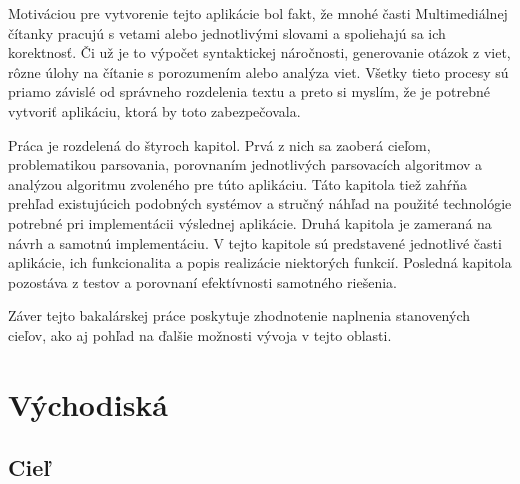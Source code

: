 \documentclass[12pt,a4paper]{report}
\theoremstyle{definition}
\theoremstyle{remark}
\begin{document}
Motiváciou pre vytvorenie tejto aplikácie bol fakt, že mnohé časti Multimediálnej čítanky pracujú s vetami alebo jednotlivými slovami a spoliehajú sa ich korektnosť. Či už je to výpočet syntaktickej náročnosti, generovanie otázok z viet,  rôzne úlohy na čítanie s porozumením alebo analýza viet. Všetky tieto procesy sú priamo závislé od správneho rozdelenia textu a preto si myslím, že je potrebné vytvoriť aplikáciu, ktorá by toto zabezpečovala.

\bigskip


Práca je rozdelená do štyroch kapitol. Prvá z nich sa zaoberá cieľom, problematikou parsovania, porovnaním jednotlivých parsovacích algoritmov a analýzou algoritmu zvoleného pre túto aplikáciu. Táto kapitola tiež zahŕňa prehľad existujúcich podobných systémov a stručný náhľad na použité technológie potrebné pri implementácii výslednej aplikácie. Druhá kapitola je zameraná na návrh a samotnú implementáciu. V tejto kapitole sú predstavené jednotlivé časti aplikácie, ich funkcionalita a popis realizácie niektorých funkcií. Posledná kapitola pozostáva z testov a porovnaní  efektívnosti samotného riešenia.
\bigskip


Záver tejto bakalárskej práce poskytuje zhodnotenie naplnenia stanovených cieľov, ako aj pohľad na ďalšie možnosti vývoja v tejto oblasti.

\chapter{Východiská}
\section{Cieľ}
\end{document}
